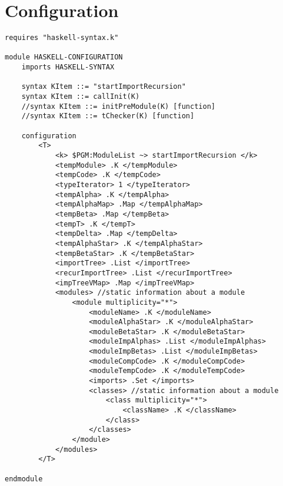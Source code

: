 \chapter{Configuration}
\begin{lstlisting}
requires "haskell-syntax.k"

module HASKELL-CONFIGURATION
    imports HASKELL-SYNTAX

    syntax KItem ::= "startImportRecursion"
    syntax KItem ::= callInit(K)
    //syntax KItem ::= initPreModule(K) [function]
    //syntax KItem ::= tChecker(K) [function]

    configuration 
        <T>
            <k> $PGM:ModuleList ~> startImportRecursion </k>
            <tempModule> .K </tempModule>
            <tempCode> .K </tempCode>
            <typeIterator> 1 </typeIterator>
            <tempAlpha> .K </tempAlpha>
            <tempAlphaMap> .Map </tempAlphaMap>
            <tempBeta> .Map </tempBeta>
            <tempT> .K </tempT>
            <tempDelta> .Map </tempDelta>
            <tempAlphaStar> .K </tempAlphaStar>
            <tempBetaStar> .K </tempBetaStar>
            <importTree> .List </importTree>
            <recurImportTree> .List </recurImportTree>
            <impTreeVMap> .Map </impTreeVMap>
            <modules> //static information about a module
                <module multiplicity="*">
                    <moduleName> .K </moduleName>
                    <moduleAlphaStar> .K </moduleAlphaStar>
                    <moduleBetaStar> .K </moduleBetaStar>
                    <moduleImpAlphas> .List </moduleImpAlphas>
                    <moduleImpBetas> .List </moduleImpBetas>
                    <moduleCompCode> .K </moduleCompCode>
                    <moduleTempCode> .K </moduleTempCode>
                    <imports> .Set </imports>
                    <classes> //static information about a module
                        <class multiplicity="*">
                            <className> .K </className>
                        </class>
                    </classes>
                </module>
            </modules>
        </T>

endmodule
\end{lstlisting}